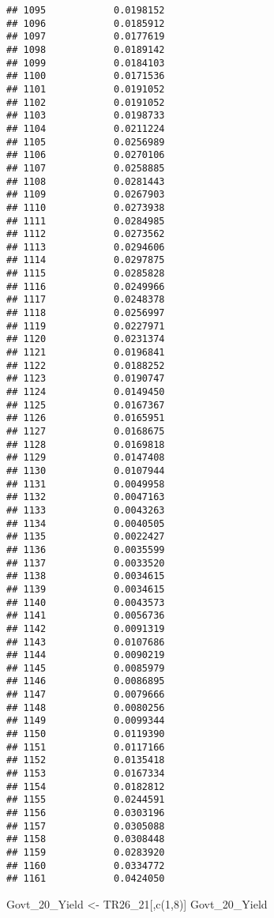 \documentclass[
]{article}
\newenvironment{Shaded}{\begin{snugshade}}{\end{snugshade}}
\newcommand{\DecValTok}[1]{\textcolor[rgb]{0.00,0.00,0.81}{#1}}
\newcommand{\FunctionTok}[1]{\textcolor[rgb]{0.00,0.00,0.00}{#1}}
\newcommand{\NormalTok}[1]{#1}
\newcommand{\OtherTok}[1]{\textcolor[rgb]{0.56,0.35,0.01}{#1}}
\begin{document}
\begin{verbatim}
## 1095            0.0198152
## 1096            0.0185912
## 1097            0.0177619
## 1098            0.0189142
## 1099            0.0184103
## 1100            0.0171536
## 1101            0.0191052
## 1102            0.0191052
## 1103            0.0198733
## 1104            0.0211224
## 1105            0.0256989
## 1106            0.0270106
## 1107            0.0258885
## 1108            0.0281443
## 1109            0.0267903
## 1110            0.0273938
## 1111            0.0284985
## 1112            0.0273562
## 1113            0.0294606
## 1114            0.0297875
## 1115            0.0285828
## 1116            0.0249966
## 1117            0.0248378
## 1118            0.0256997
## 1119            0.0227971
## 1120            0.0231374
## 1121            0.0196841
## 1122            0.0188252
## 1123            0.0190747
## 1124            0.0149450
## 1125            0.0167367
## 1126            0.0165951
## 1127            0.0168675
## 1128            0.0169818
## 1129            0.0147408
## 1130            0.0107944
## 1131            0.0049958
## 1132            0.0047163
## 1133            0.0043263
## 1134            0.0040505
## 1135            0.0022427
## 1136            0.0035599
## 1137            0.0033520
## 1138            0.0034615
## 1139            0.0034615
## 1140            0.0043573
## 1141            0.0056736
## 1142            0.0091319
## 1143            0.0107686
## 1144            0.0090219
## 1145            0.0085979
## 1146            0.0086895
## 1147            0.0079666
## 1148            0.0080256
## 1149            0.0099344
## 1150            0.0119390
## 1151            0.0117166
## 1152            0.0135418
## 1153            0.0167334
## 1154            0.0182812
## 1155            0.0244591
## 1156            0.0303196
## 1157            0.0305088
## 1158            0.0308448
## 1159            0.0283920
## 1160            0.0334772
## 1161            0.0424050
\end{verbatim}

\begin{Shaded}
\begin{Highlighting}[]
\NormalTok{Govt\_20\_Yield }\OtherTok{\textless{}{-}}\NormalTok{ TR26\_21[,}\FunctionTok{c}\NormalTok{(}\DecValTok{1}\NormalTok{,}\DecValTok{8}\NormalTok{)]}
\NormalTok{Govt\_20\_Yield }
\end{Highlighting}
\end{Shaded}
\end{document}
